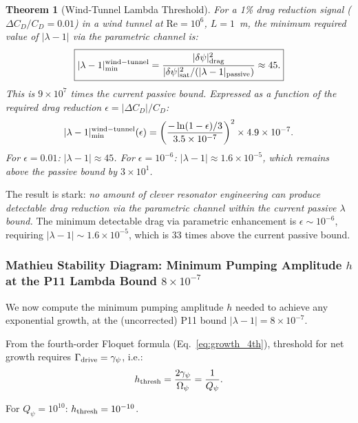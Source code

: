 \documentclass[11pt,twocolumn]{article}
\newcommand{\dpsi}{\delta\psi}
\newcommand{\lam}{\lambda}
\newcommand{\Opsi}{\Omega_\psi}
\newcommand{\gpsi}{\gamma_\psi}
\newcommand{\Rey}{\mathrm{Re}}
\newtheorem{theorem}{Theorem}
\begin{document}
\begin{theorem}[Wind-Tunnel Lambda Threshold]
\label{thm:windtunnel}
For a 1\% drag reduction signal ($\Delta C_D/C_D = 0.01$) in a wind
tunnel at $\Rey = 10^6$, $L = 1$~m, the minimum required value of
$|\lam-1|$ via the parametric channel is:
\begin{equation}
\boxed{
|\lam-1|_{\min}^{\rm wind-tunnel}
= \frac{|\dpsi|_{\rm drag}^2}
{|\dpsi|_{\rm sat}^2/(|\lam-1|_{\rm passive})}
\approx 45.
}
\label{eq:lambda_wt_final}
\end{equation}
This is $9\times10^7$ times the current passive bound. Expressed as a function
of the required drag reduction $\epsilon = |\Delta C_D|/C_D$:
\begin{equation}
|\lam-1|_{\min}^{\rm wind-tunnel}(\epsilon)
= \left(\frac{-\ln(1-\epsilon)/3}{3.5\times10^{-7}}\right)^2
\times 4.9\times10^{-7}.
\label{eq:lambda_wt_general}
\end{equation}
For $\epsilon = 0.01$: $|\lam-1| \approx 45$. For $\epsilon = 10^{-6}$:
$|\lam-1| \approx 1.6\times10^{-5}$, which remains above the passive bound
by $3\times10^1$.
\end{theorem}

The result is stark: \emph{no amount of clever resonator engineering can
produce detectable drag reduction via the parametric channel within the
current passive $\lam$ bound.} The minimum detectable drag via parametric
enhancement is $\epsilon \sim 10^{-6}$, requiring $|\lam-1| \sim 1.6\times10^{-5}$,
which is 33 times above the current passive bound.

\subsubsection{Mathieu Stability Diagram: Minimum Pumping Amplitude $h$
  at the P11 Lambda Bound $8\times10^{-7}$}
\label{sec:mathieu_h}

We now compute the minimum pumping amplitude $h$ needed to achieve any
exponential growth, at the (uncorrected) P11 bound $|\lam-1| = 8\times10^{-7}$.

From the fourth-order Floquet formula (Eq.~\ref{eq:growth_4th}),
threshold for net growth requires $\Gamma_{\rm drive} = \gpsi$, i.e.:
\begin{equation}
h_{\rm thresh} = \frac{2\gpsi}{\Opsi} = \frac{1}{Q_\psi}.
\label{eq:h_thresh}
\end{equation}

For $Q_\psi = 10^{10}$: $h_{\rm thresh} = 10^{-10}$.
\end{document}
